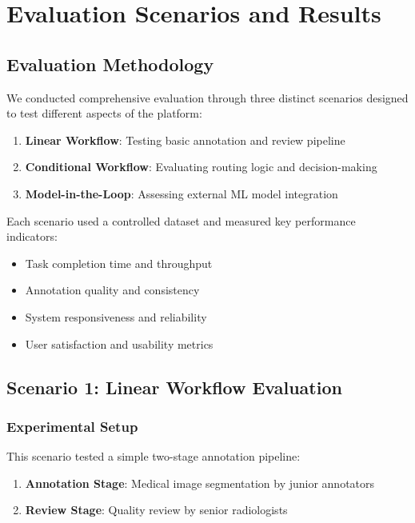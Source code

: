 \section{Evaluation Scenarios and Results}
\label{sec:evaluation-scenarios}

\subsection{Evaluation Methodology}

We conducted comprehensive evaluation through three distinct scenarios designed to test different aspects of the platform:

\begin{enumerate}
    \item \textbf{Linear Workflow}: Testing basic annotation and review pipeline
    \item \textbf{Conditional Workflow}: Evaluating routing logic and decision-making
    \item \textbf{Model-in-the-Loop}: Assessing external ML model integration
\end{enumerate}

Each scenario used a controlled dataset and measured key performance indicators:
\begin{itemize}
    \item Task completion time and throughput
    \item Annotation quality and consistency
    \item System responsiveness and reliability
    \item User satisfaction and usability metrics
\end{itemize}

\subsection{Scenario 1: Linear Workflow Evaluation}
\label{subsec:scenario-linear}

\subsubsection{Experimental Setup}

This scenario tested a simple two-stage annotation pipeline:
\begin{enumerate}
    \item \textbf{Annotation Stage}: Medical image segmentation by junior annotators
    \item \textbf{Review Stage}: Quality review by senior radiologists
\end{enumerate}

